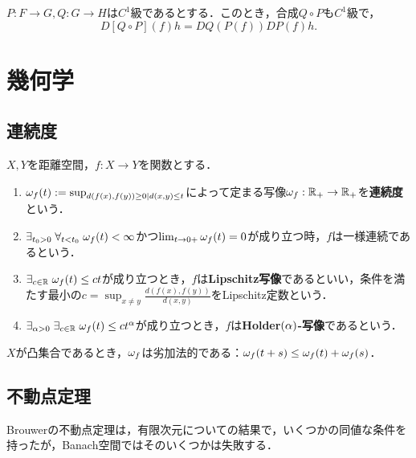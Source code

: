 \documentclass[uplatex,dvipdfmx]{jsreport}
\begin{document}
\begin{theorem}[連鎖律]
    $P:F\to G,Q:G\to H$は$C^1$級であるとする．このとき，合成$Q\circ P$も$C^1$級で，
    \[D[Q\circ P](f)h=DQ(P(f))DP(f)h.\]
\end{theorem}

\section{幾何学}

\subsection{連続度}

\begin{definition}
    $X,Y$を距離空間，$f:X\to Y$を関数とする．
    \begin{enumerate}
        \item $\omega_f(t):=\sup_{d(f(x),f(y))\ge0\mid d(x,y)\le t}$によって定まる写像$\omega_f:\mathbb{R}_+\to\mathbb{R}_+$を\textbf{連続度}という．
        \item $\exists_{t_0>0}\;\forall_{t<t_0}\;\omega_f(t)<\infty$かつ$\lim_{t\to0+}\omega_f(t)=0$が成り立つ時，$f$は一様連続であるという．
        \item $\exists_{c\in\mathbb{R}}\;\omega_f(t)\le ct$が成り立つとき，$f$は\textbf{Lipschitz写像}であるといい，条件を満たす最小の$c=\sup_{x\ne y}\frac{d(f(x),f(y))}{d(x,y)}$をLipschitz定数という．
        \item $\exists_{\alpha>0}\;\exists_{c\in\mathbb{R}}\;\omega_f(t)\le ct^\alpha$が成り立つとき，$f$は\textbf{Holder$(\alpha)$-写像}であるという．
    \end{enumerate}
\end{definition}

\begin{lemma}
    $X$が凸集合であるとき，$\omega_f$は劣加法的である：$\omega_f(t+s)\le\omega_f(t)+\omega_f(s)$．
\end{lemma}

\subsection{不動点定理}

\begin{tcolorbox}[colframe=ForestGreen, colback=ForestGreen!10!white,breakable,colbacktitle=ForestGreen!40!white,coltitle=black,fonttitle=\bfseries\sffamily,
title=]
    Brouwerの不動点定理は，有限次元についての結果で，いくつかの同値な条件を持ったが，Banach空間ではそのいくつかは失敗する．
\end{tcolorbox}
\end{document}
